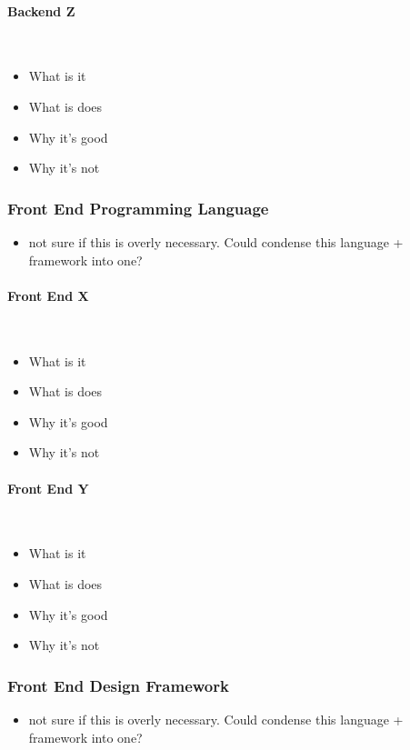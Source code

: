 \paragraph{Backend Z}\ \\
{\color{red}
	\begin{itemize}
		\item What is it
		\item What is does
		\item Why it's good
		\item Why it's not
	\end{itemize}
}

\subsubsection{Front End Programming Language}
{\color{red}
	\begin{itemize}
		\item not sure if this is overly necessary. Could condense this language + framework into one?
	\end{itemize}
}

\paragraph{Front End X}\ \\
{\color{red}
	\begin{itemize}
		\item What is it
		\item What is does
		\item Why it's good
		\item Why it's not
	\end{itemize}
}

\paragraph{Front End Y}\ \\
{\color{red}
	\begin{itemize}
		\item What is it
		\item What is does
		\item Why it's good
		\item Why it's not
	\end{itemize}
}


\subsubsection{Front End Design Framework}
{\color{red}
	\begin{itemize}
		\item not sure if this is overly necessary. Could condense this language + framework into one?
	\end{itemize}
}

